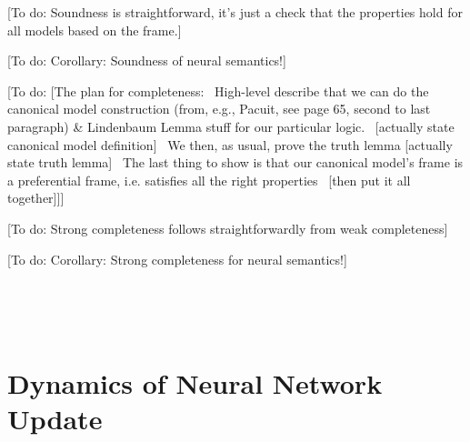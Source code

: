 \documentclass{article}
\newcommand{\tmem}[1]{{\em #1\/}}
\newcommand{\todo}[1]{{\color{red!75!black}[To do: #1]}}
\begin{document}
{\todo{Soundness is straightforward, it's just a check that the properties
hold for all models based on the frame.}}

{\todo{Corollary: Soundness of neural semantics!}}

{\todo{[The plan for completeness: \ High-level describe that we can do the
canonical model construction (from, e.g., Pacuit, see page 65, second to last
paragraph) \& Lindenbaum Lemma stuff for our particular logic. \ [actually
state canonical model definition] \ We then, as usual, prove the truth lemma
[actually state truth lemma] \ The last thing to show is that our canonical
model's frame is a preferential frame, i.e. satisfies all the right properties
\ [then put it all together]]}}

{\todo{Strong completeness follows straightforwardly from weak completeness}}

{\todo{Corollary: Strong completeness for neural semantics!}}

\

\

\section{Dynamics of Neural Network Update}{\tmem{}}

\begin{thebibliography}{}
  \ 
\end{thebibliography}
\end{document}
